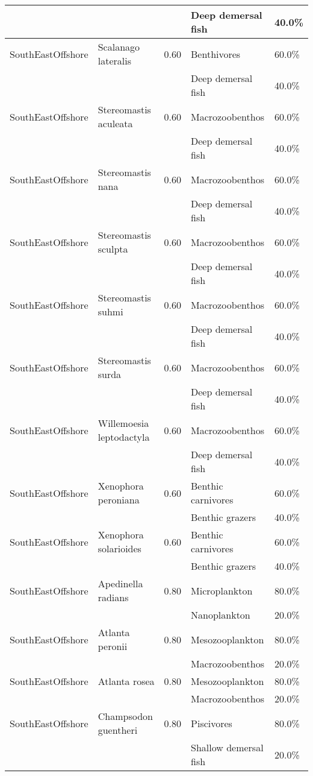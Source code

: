 \begin{longtable}{llcll}
& & & Deep demersal fish & 40.0\% \\
\hline
SouthEastOffshore & Scalanago lateralis & 0.60 & Benthivores & 60.0\% \\
& & & Deep demersal fish & 40.0\% \\
\hline
SouthEastOffshore & Stereomastis aculeata & 0.60 & Macrozoobenthos & 60.0\% \\
& & & Deep demersal fish & 40.0\% \\
\hline
SouthEastOffshore & Stereomastis nana & 0.60 & Macrozoobenthos & 60.0\% \\
& & & Deep demersal fish & 40.0\% \\
\hline
SouthEastOffshore & Stereomastis sculpta & 0.60 & Macrozoobenthos & 60.0\% \\
& & & Deep demersal fish & 40.0\% \\
\hline
SouthEastOffshore & Stereomastis suhmi & 0.60 & Macrozoobenthos & 60.0\% \\
& & & Deep demersal fish & 40.0\% \\
\hline
SouthEastOffshore & Stereomastis surda & 0.60 & Macrozoobenthos & 60.0\% \\
& & & Deep demersal fish & 40.0\% \\
\hline
SouthEastOffshore & Willemoesia leptodactyla & 0.60 & Macrozoobenthos & 60.0\% \\
& & & Deep demersal fish & 40.0\% \\
\hline
SouthEastOffshore & Xenophora peroniana & 0.60 & Benthic carnivores & 60.0\% \\
& & & Benthic grazers & 40.0\% \\
\hline
SouthEastOffshore & Xenophora solarioides & 0.60 & Benthic carnivores & 60.0\% \\
& & & Benthic grazers & 40.0\% \\
\hline
SouthEastOffshore & Apedinella radians & 0.80 & Microplankton & 80.0\% \\
& & & Nanoplankton & 20.0\% \\
\hline
SouthEastOffshore & Atlanta peronii & 0.80 & Mesozooplankton & 80.0\% \\
& & & Macrozoobenthos & 20.0\% \\
\hline
SouthEastOffshore & Atlanta rosea & 0.80 & Mesozooplankton & 80.0\% \\
& & & Macrozoobenthos & 20.0\% \\
\hline
SouthEastOffshore & Champsodon guentheri & 0.80 & Piscivores & 80.0\% \\
& & & Shallow demersal fish & 20.0\% \\

\end{longtable}
